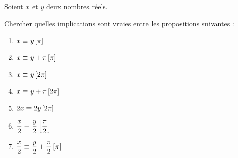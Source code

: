 \begin{exo}[Exercice 9]
Soient \(x\) et \(y\) deux nombres réels.

Chercher quelles implications sont vraies entre les propositions suivantes :

\begin{enumerate}
\item \(x\equiv y\left[\pi\right]\) \\

\item \(x\equiv y+\pi\left[\pi\right]\) \\

\item \(x\equiv y\left[2\pi\right]\) \\

\item \(x\equiv y+\pi\left[2\pi\right]\) \\

\item \(2x\equiv 2y\left[2\pi\right]\) \\

\item \(\dfrac{x}{2}\equiv\dfrac{y}{2}\left[\dfrac{\pi}{2}\right]\) \\

\item \(\dfrac{x}{2}\equiv\dfrac{y}{2}+\dfrac{\pi}{2}\left[\pi\right]\)
\end{enumerate}
\end{exo}

\begin{corr}
\end{corr}